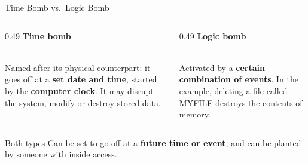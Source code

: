 \documentclass[aspectratio=169,11pt,xcolor={table}]{beamer}
\begin{document}
\begin{frame}{Time Bomb vs.\ Logic Bomb}
  \begin{columns}[T]
    \begin{column}{0.49\textwidth}
      \centering\textbf{\textcolor{amber!80!black}{Time bomb}}\\[2mm]
      \\[2mm]
      {\small Named after its physical counterpart: it goes off at a \textbf{set date and time}, started by the \textbf{computer clock}. It may disrupt the system, modify or destroy stored data.}
    \end{column}
    \begin{column}{0.49\textwidth}
      \centering\textbf{\textcolor{grape}{Logic bomb}}\\[2mm]
      \\[4mm]
      {\small Activated by a \textbf{certain combination of events}. In the example, deleting a file called MYFILE destroys the contents of memory.}
    \end{column}
  \end{columns}
  \vspace{3mm}
  \begin{block}{Both types}
    \small Can be set to go off at a \textbf{future time or event}, and can be planted by someone with inside access.
  \end{block}
\end{frame}
\end{document}

